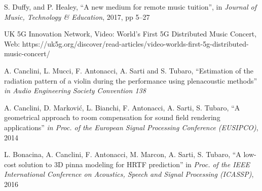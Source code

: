 S. Duffy, and P. Healey, ``A new medium for remote music tuition'', in \emph{Journal of Music, Technology \& Education}, 2017, pp 5--27

UK 5G Innovation Network, Video: World's First 5G Distributed Music Concert, Web: https://uk5g.org/discover/read-articles/video-worlds-first-5g-distributed-music-concert/

A. Canclini, L. Mucci, F. Antonacci, A. Sarti and S. Tubaro, ``Estimation of the radiation pattern of a violin during the performance using plenacoustic methods'' \emph{in Audio Engineering Society Convention 138}

A. Canclini, D. Marković, L. Bianchi, F. Antonacci, A. Sarti, S. Tubaro, ``A geometrical approach to room compensation for sound field rendering applications'' \emph{in Proc. of the European Signal Processing Conference (EUSIPCO)}, 2014

L. Bonacina, A. Canclini, F. Antonacci, M. Marcon, A. Sarti, S. Tubaro, ``A low-cost solution to 3D pinna modeling for HRTF prediction'' in \emph{Proc. of the IEEE International Conference on Acoustics, Speech and Signal Processing (ICASSP)}, 2016


%	
%	
%	
%	
%	
%	